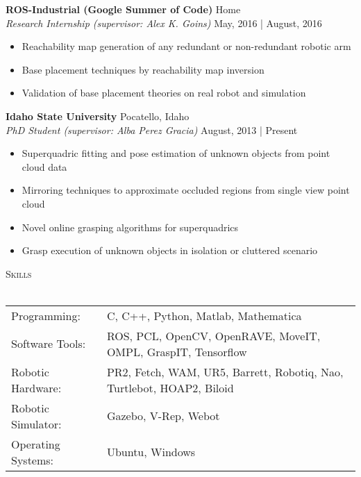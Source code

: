\documentclass[a4paper]{article}
\newcommand{\lineunder} {
    \vspace*{-8pt} \\
    \hspace*{-18pt} \hrulefill \\
}
\newcommand{\header} [1] {
    {\hspace*{-18pt}\vspace*{6pt} \textsc{#1}}
    \vspace*{-6pt} \lineunder
}
\begin{document}
\textbf{ROS-Industrial (Google Summer of Code)} \hfill Home\\
\textit{Research Internship (supervisor: Alex K. Goins)} \hfill May, 2016 | August, 2016\\
\vspace{-1mm}
\begin{itemize} \itemsep 1pt
	\item Reachability map generation of any redundant or non-redundant robotic arm
	\item Base placement techniques by reachability map inversion
	\item Validation of base placement theories on real robot and simulation
\end{itemize}

\textbf{Idaho State University} \hfill Pocatello, Idaho\\
\textit{PhD Student (supervisor: Alba Perez Gracia)} \hfill August, 2013 | Present\\
\vspace{-1mm}
\begin{itemize} \itemsep 1pt
	\item Superquadric fitting and pose estimation of unknown objects from point cloud data
	\item Mirroring techniques to approximate occluded regions from single view point cloud
	\item Novel online grasping algorithms for superquadrics
	\item Grasp execution of unknown objects in isolation or cluttered scenario
\end{itemize}

\header{Skills}
\begin{tabular}{ l l }
	Programming:       & C, C++, Python, Matlab, Mathematica                                   \\
	Software Tools:    & ROS, PCL, OpenCV, OpenRAVE, MoveIT, OMPL, GraspIT, Tensorflow         \\
	Robotic Hardware:  & PR2, Fetch, WAM, UR5, Barrett, Robotiq, Nao, Turtlebot, HOAP2, Biloid \\
	Robotic Simulator: & Gazebo, V-Rep, Webot                                                  \\
	Operating Systems: & Ubuntu, Windows                                                       \\
\end{tabular}

\vspace*{2mm}
\end{document}
